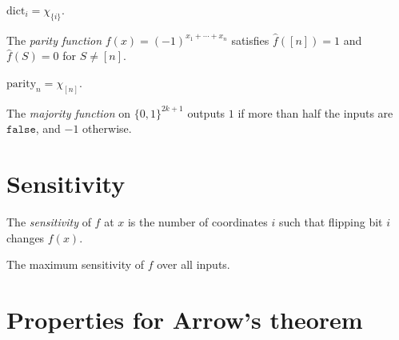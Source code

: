 \begin{lemma}
\leanok
{}
$\mathrm{dict}_i = \chi_{\{i\}}$.
\end{lemma}

\begin{definition}[Parity]
\leanok
{}
The \emph{parity function} $f(x) = (-1)^{x_1+\cdots+x_n}$ satisfies
$\hat f([n]) = 1$ and $\hat f(S) = 0$ for $S\ne[n]$.
\end{definition}

\begin{lemma}
\leanok
{}
$\mathrm{parity}_n = \chi_{[n]}$.
\end{lemma}

\begin{definition}[Majority]
\leanok
{}
The \emph{majority function} on $\{0,1\}^{2k+1}$ outputs $1$ if more than half
the inputs are $\texttt{false}$, and $-1$ otherwise.
\end{definition}

\section{Sensitivity}

\begin{definition}
\leanok
{}
The \emph{sensitivity} of $f$ at $x$ is the number of coordinates $i$ such
that flipping bit $i$ changes $f(x)$.
\end{definition}

\begin{definition}
\leanok
{}
The maximum sensitivity of $f$ over all inputs.
\end{definition}

\section{Properties for Arrow's theorem}

